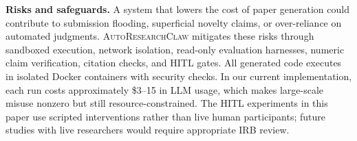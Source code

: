 \documentclass{llmxive}
\providecommand{\system}{\textsc{AutoResearchClaw}}
\begin{document}
\noindent \textbf{Risks and safeguards.}
A system that lowers the cost of paper generation could contribute to submission flooding, superficial novelty claims, or over-reliance on automated judgments. \system{} mitigates these risks through sandboxed execution, network isolation, read-only evaluation harnesses, numeric claim verification, citation checks, and HITL gates. All generated code executes in isolated Docker containers with security checks. In our current implementation, each run costs approximately \$3--15 in LLM usage, which makes large-scale misuse nonzero but still resource-constrained. The HITL experiments in this paper use scripted interventions rather than live human participants; future studies with live researchers would require appropriate IRB review.



% 
% 
\end{document}
